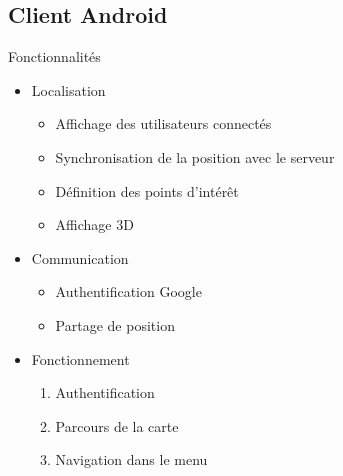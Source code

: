 \documentclass{beamer} %
\begin{document}
  \subsection{Client Android}
  \begin{frame}{\subsecname}
    \begin{block}{Fonctionnalités}
      \begin{itemize}
        \item Localisation
        \begin{itemize}
          \item Affichage des utilisateurs connectés
          \item Synchronisation de la position avec le serveur
          \item Définition des points d'intérêt
          \item Affichage 3D
        \end{itemize}

        \pause

        \item Communication
        \begin{itemize}
          \item Authentification Google
          \item Partage de position
        \end{itemize}

        \pause

        \item Fonctionnement
        \begin{enumerate}
          \item Authentification
          \item Parcours de la carte
          \item Navigation dans le menu
        \end{enumerate}
      \end{itemize}
    \end{block}
    
  \end{frame}
\end{document}
